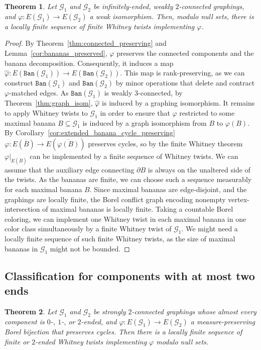 \documentclass{article}
\theoremstyle{plain}
\newtheorem{thm}{Theorem}[section]
\theoremstyle{definition}
\newcommand{\cG}{\mathcal{G}}
\begin{document}
\begin{thm}\label{thm:infty_ended_whitney_twists}
    Let $\cG_1$ and $\cG_2$ be infinitely-ended, weakly $2$-connected graphings, and $\varphi: E(\cG_1) \to E(\cG_2)$ a weak isomorphism. Then, modulo null sets, there is a locally finite sequence of finite Whitney twists implementing $\varphi$. 
\end{thm}
\begin{proof}
    By Theorem~\ref{thm:connected_preserving} and Lemma~\ref{cor:bananas_preserved}, $\varphi$ preserves the connected components and the banana decomposition. Consequently, it induces a map $\hat{\varphi}:E(\texttt{Ban}(\cG_1)) \to E(\texttt{Ban}(\cG_2))$. This map is rank-preserving, as we can construct $\texttt{Ban}(\cG_1)$ and $\texttt{Ban}(\cG_2)$ by minor operations that delete and contract $\varphi$-matched edges. As $\texttt{Ban}(\cG_1)$ is weakly $3$-connected, by Theorem~\ref{thm:graph_isom},  $\hat{\varphi}$ is induced by a graphing isomorphism. It remains to apply Whitney twists to $\cG_1$ in order to ensure that $\varphi$ restricted to some maximal banana $B \subseteq \cG_1$ is induced by a graph isomorphism from $B$ to $\varphi(B)$. By Corollary~\ref{cor:extended_banana_cycle_preserving} $\varphi: E(\overline{B}) \to E(\overline{\varphi(B)})$ preserves cycles, so by the finite Whitney theorem $\varphi|_{E(\overline{B})}$ can be implemented by a finite sequence of Whitney twists. We can assume that the auxiliary edge connecting $\partial B$ is always on the unaltered side of the twists. As the bananas are finite, we can choose such a sequence measurably for each maximal banana $B$. Since maximal bananas are edge-disjoint, and the graphings are locally finite, the Borel conflict graph encoding nonempty vertex-intersection of maximal bananas is locally finite. Taking a countable Borel coloring, we can implement one Whitney twist in each maximal banana in one color class simultaneously by a finite Whitney twist of $\cG_1$. We might need a locally finite sequence of such finite Whitney twists, as the size of maximal bananas in $\cG_1$ might not be bounded.
\end{proof}

\subsection{Classification for components with at most two ends}

\begin{thm} \label{thm:1-2-ended}
    Let $\cG_1$ and $\cG_2$ be strongly $2$-connected graphings whose almost every component is $0$-, $1$-, or $2$-ended, and $\varphi: E(\cG_1) \to E(\cG_2)$ a measure-preserving Borel bijection that preserves cycles. Then there is a locally finite sequence of finite  or $2$-ended Whitney twists implementing $\varphi$ modulo null sets. 
\end{thm}
\end{document}
